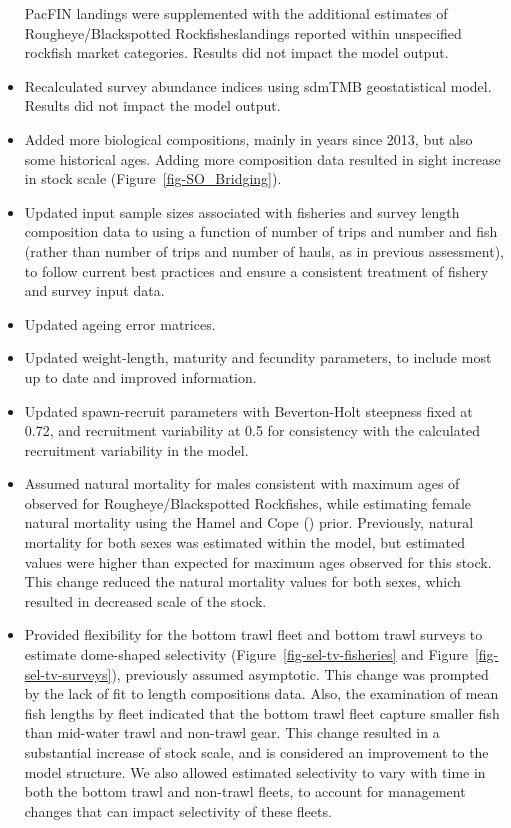 \documentclass[
]{scrartcl}
\begin{document}
\begin{itemize}
  PacFIN landings were supplemented with the additional estimates of
  Rougheye/Blackspotted Rockfisheslandings reported within unspecified
  rockfish market categories. Results did not impact the model output.
\item
  Recalculated survey abundance indices using sdmTMB geostatistical
  model. Results did not impact the model output.
\item
  Added more biological compositions, mainly in years since 2013, but
  also some historical ages. Adding more composition data resulted in
  sight increase in stock scale (Figure~\ref{fig-SO_Bridging}).
\item
  Updated input sample sizes associated with fisheries and survey length
  composition data to using a function of number of trips and number and
  fish (rather than number of trips and number of hauls, as in previous
  assessment), to follow current best practices and ensure a consistent
  treatment of fishery and survey input data.
\item
  Updated ageing error matrices.
\item
  Updated weight-length, maturity and fecundity parameters, to include
  most up to date and improved information.
\item
  Updated spawn-recruit parameters with Beverton-Holt steepness fixed at
  0.72, and recruitment variability at 0.5 for consistency with the
  calculated recruitment variability in the model.
\item
  Assumed natural mortality for males consistent with maximum ages of
  observed for Rougheye/Blackspotted Rockfishes, while estimating female
  natural mortality using the Hamel and Cope
  () prior. Previously,
  natural mortality for both sexes was estimated within the model, but
  estimated values were higher than expected for maximum ages observed
  for this stock. This change reduced the natural mortality values for
  both sexes, which resulted in decreased scale of the stock.
\item
  Provided flexibility for the bottom trawl fleet and bottom trawl
  surveys to estimate dome-shaped selectivity
  (Figure~\ref{fig-sel-tv-fisheries} and
  Figure~\ref{fig-sel-tv-surveys}), previously assumed asymptotic. This
  change was prompted by the lack of fit to length compositions data.
  Also, the examination of mean fish lengths by fleet indicated that the
  bottom trawl fleet capture smaller fish than mid-water trawl and
  non-trawl gear. This change resulted in a substantial increase of
  stock scale, and is considered an improvement to the model structure.
  We also allowed estimated selectivity to vary with time in both the
  bottom trawl and non-trawl fleets, to account for management changes
  that can impact selectivity of these fleets.
\end{itemize}
\end{document}
